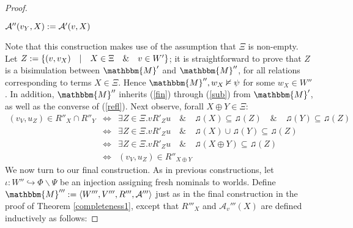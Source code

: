\begin{proof}
\begin{itemizedot}
    \item $\mathcal{A}'' (v_Y, X) := \mathcal{A}' (v, X)$
  \end{itemizedot}
  Note that this construction makes use of the assumption that $\Xi$ is
  non-empty.  Let $Z := \{(v, v_X) \hspace{1em} | \hspace{1em} X \in \Xi
  \hspace{1em} \& \hspace{1em} v \in W' \}$; it is straightforward to prove
  that $Z$ is a bisimulation between $\mathbbm{M}'$ and $\mathbbm{M}''$, for
  all relations corresponding to terms $X \in \Xi$. Hence $\mathbbm{M}'', w_X
  \nvDash \psi$ for some $w_X \in W''$.  In addition, $\mathbbm{M}''$
  inherits (\ref{fin}) through (\ref{sub}) from $\mathbbm{M}'$, as well as the
  converse of (\ref{refl}).  Next observe, forall $X \oplus Y \in \Xi$:
  \begin{eqnarray*}
    \text{$(v_V, u_Z) \in R''_X \cap R''_Y$} & \Longleftrightarrow & \exists Z
    \in \Xi . \text{$v R'_Z u \hspace{1em} \& \hspace{1em} \twonotes (X)
    \subseteq \twonotes (Z) \hspace{1em} \& \hspace{1em} \twonotes (Y)
    \subseteq \twonotes (Z)$}\\
    & \Longleftrightarrow & \exists Z \in \Xi . \text{$v R'_Z u \hspace{1em}
    \& \hspace{1em} \twonotes (X) \cup \twonotes (Y) \subseteq \twonotes
    (Z)$}\\
    & \Longleftrightarrow & \exists Z \in \Xi . \text{$v R'_Z u \hspace{1em}
    \& \hspace{1em} \twonotes (X \oplus Y) \subseteq \twonotes (Z)$}\\
    & \Longleftrightarrow &  \text{$(v_V, u_Z) \in R''_{X \oplus Y}$}
  \end{eqnarray*}
  We now turn to our final construction. As in previous constructions, let
  $\iota : W'' \hookrightarrow \Phi \backslash \Psi$ be an injection assigning
  fresh nominals to worlds.  Define $\mathbbm{M}''' \assign \langle W''',
  V''', R''', \mathcal{A}''' \rangle$ just as in the final construction in the
  proof of Theorem \ref{completeness1}, except that $R'''_X$ and
  $\mathcal{A}_v''' (X)$ are defined inductively as follows:
  
  
  

\end{proof}
